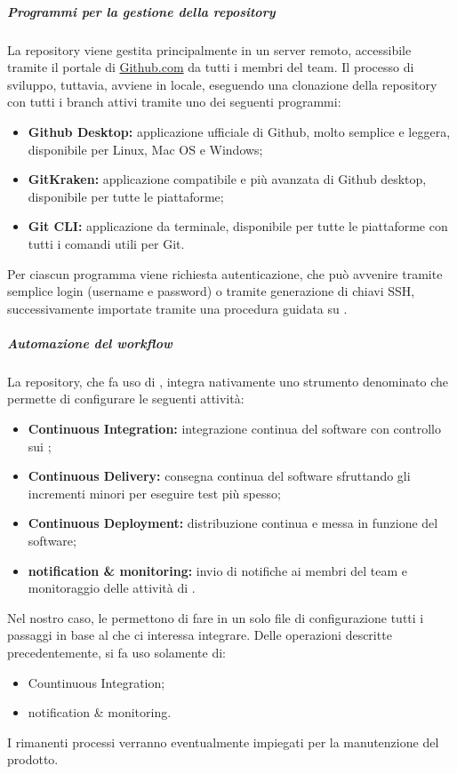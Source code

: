 		\subparagraph{Programmi per la gestione della repository}

		La repository viene gestita principalmente in un server remoto, accessibile tramite il portale di \href{https://github.com}{Github.com} da tutti i membri del team.
		Il processo di sviluppo, tuttavia, avviene in locale, eseguendo una clonazione della repository con tutti i branch attivi tramite uno dei seguenti programmi:
		\begin{itemize}
			\item \textbf{Github Desktop:} applicazione ufficiale di Github, molto semplice e leggera, disponibile per Linux, Mac OS e Windows;
			\item \textbf{GitKraken:} applicazione compatibile e più avanzata di Github desktop, disponibile per tutte le piattaforme;
			\item \textbf{Git CLI:} applicazione da terminale, disponibile per tutte le piattaforme con tutti i comandi utili per Git.
		\end{itemize}
		Per ciascun programma viene richiesta autenticazione, che può avvenire tramite semplice login (username e password) o tramite generazione di chiavi SSH, successivamente importate tramite una procedura guidata su .

		\subparagraph{Automazione del workflow}

		La repository, che fa uso di , integra nativamente uno strumento denominato  che permette di configurare le seguenti attività:
		\begin{itemize}
			\item \textbf{Continuous Integration:} integrazione continua del software con controllo sui ;
			\item \textbf{Continuous Delivery:} consegna continua del software sfruttando gli incrementi minori per eseguire test più spesso;
			\item \textbf{Continuous Deployment:} distribuzione continua e messa in funzione del software;
			\item \textbf{notification \& monitoring:} invio di notifiche ai membri del team e monitoraggio delle attività di .
		\end{itemize}
		Nel nostro caso, le  permettono di fare in un solo file di configurazione tutti i passaggi in base al  che ci interessa integrare. 
		\newline
		Delle operazioni descritte precedentemente, si fa uso solamente di:
		\begin{itemize}
			\item Countinuous Integration;
			\item notification \& monitoring.
		\end{itemize}
		I rimanenti processi verranno eventualmente impiegati per la manutenzione del prodotto.


